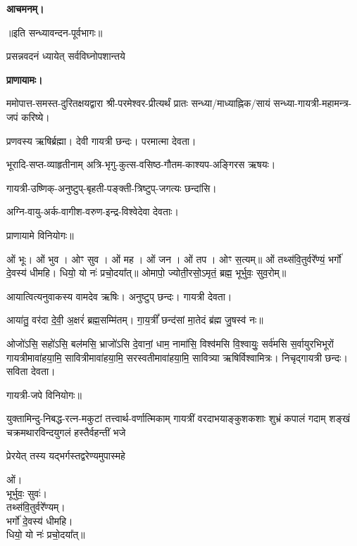 \textbf{आचमनम्।}


\centerline{॥इति सन्ध्यावन्दन-पूर्वभागः॥}



{प्रसन्नवदनं ध्यायेत् सर्वविघ्नोपशान्तये}

\textbf{प्राणायामः।}

ममोपात्त-समस्त-दुरितक्षयद्वारा श्री-परमेश्वर-प्रीत्यर्थं प्रातः सन्ध्या/माध्याह्निक/सायं सन्ध्या-गायत्री-महामन्त्र-जपं करिष्ये।


प्रणवस्य ऋषिर्ब्रह्मा।
देवी गायत्री छन्दः।
परमात्मा देवता।

भूरादि-सप्त-व्याहृतीनाम् अत्रि-भृगु-कुत्स-वसिष्ठ-गौतम-काश्यप-अङ्गिरस ऋषयः।

गायत्री-उष्णिक्-अनुष्टुप्-बृहती-पङ्क्ती-त्रिष्टुप्-जगत्यः छन्दांसि।

अग्नि-वायु-अर्क-वागीश-वरुण-इन्द्र-विश्वेदेवा देवताः।
      
प्राणायामे विनियोगः॥


ओं भूः। ओं भुव। ओꣳ सुव। ओं मह। ओं जन। ओं तप। ओꣳ स॒त्यम्॥
ओं तथ्स॑वि॒तुर्वरे᳚ण्यं॒ भर्गो॑ दे॒वस्य॑ धीमहि। धियो॒ यो नः॑ प्रचो॒दया᳚त्॥
ओमापो॒ ज्योती॒रसो॒ऽमृतं॒ ब्रह्म॒ भूर्भुवः॒ सुव॒रोम्॥




आयात्वित्यनुवाकस्य वामदेव ऋषिः।
अनुष्टुप् छन्दः।
गायत्री देवता।

आया॑तु॒ वर॑दा दे॒वी॒ अ॒क्षरं॑ ब्रह्म॒सम्मि॑तम्। गा॒य॒त्रीं᳚ छन्द॑सां मा॒तेदं ब्र॑ह्म जु॒षस्व॑ नः॥

ओजो॑ऽसि॒ सहो॑ऽसि॒ बल॑मसि॒ भ्राजो॑ऽसि दे॒वानां॒ धाम॒ नामा॑सि॒ विश्व॑मसि वि॒श्वायुः॒ सर्व॑मसि स॒र्वायुरभिभूरों गायत्रीमावा॑हया॒मि॒ सावित्रीमावा॑हया॒मि॒ सरस्वतीमावा॑ह\-या॒मि॒ सावित्र्या ऋषिर्विश्वामित्रः। निचृद्गायत्री छन्दः। सविता देवता।

गायत्री-जपे विनियोगः॥



{युक्तामिन्दु-निबद्ध-रत्न-मकुटां तत्त्वार्थ-वर्णात्मिकाम्}
{गायत्रीं वरदाभयाङ्कुशकशाः शुभ्रं कपालं गदाम्}
{शङ्खं चक्रमथारविन्दयुगलं हस्तैर्वहन्तीं भजे}

{प्रेरयेत् तस्य यद्भर्गस्तद्वरेण्यमुपास्महे}


ओं।\\
भूर्भुवः॒ सुवः॑।\\
तथ्स॑वि॒तुर्वरे᳚ण्यम्।\\
भर्गो॑ दे॒वस्य॑ धीमहि।\\
धियो॒ यो नः॑ प्रचो॒दया᳚त्॥

